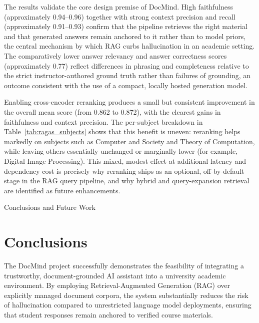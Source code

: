 \documentclass[12pt, a4paper, oneside]{report}
\makeatletter
\newcommand{\chapformat}[1]{%
  \centering
  {\fontsize{14}{17}\selectfont\itshape\addfontfeatures{LetterSpace=3.5}%
    \MakeUppercase{\chaptertitlename}\ \thechapter}\\[24pt]%
  {\fontsize{16}{19}\selectfont\bfseries\addfontfeatures{LetterSpace=0}%
    \MakeUppercase{#1}}%
}
\newcommand{\chapformatstar}[1]{%
  \centering
  {\fontsize{16}{19}\selectfont\bfseries\MakeUppercase{#1}}%
}
\newcommand{\chapterstar}[1]{%
  \clearpage
  \phantomsection
  \edef\@saved@chapcount{\the\value{chapter}}%
  \titleformat{\chapter}[block]{}{}%
    {0pt}{\chapformatstar}%
  \@originalchapter*{#1}%
  \setcounter{chapter}{\@saved@chapcount}%
  \titleformat{\chapter}[block]{}{}%
    {0pt}{\chapformat}%
}
\let\@originalchapter\chapter
\renewcommand{\chapter}{%
  \@ifstar{\chapterstar}{\@originalchapter}%
}
\let\oldsection\section
\renewcommand{\section}{%
  \addtocontents{toc}{\protect\needspace{4\baselineskip}}%
  \oldsection
}
\makeatother
\begin{document}
The results validate the core design premise of DocMind. High faithfulness (approximately 0.94--0.96) together with strong context precision and recall (approximately 0.91--0.93) confirm that the pipeline retrieves the right material and that generated answers remain anchored to it rather than to model priors, the central mechanism by which RAG curbs hallucination in an academic setting. The comparatively lower answer relevancy and answer correctness scores (approximately 0.77) reflect differences in phrasing and completeness relative to the strict instructor-authored ground truth rather than failures of grounding, an outcome consistent with the use of a compact, locally hosted generation model.

Enabling cross-encoder reranking produces a small but consistent improvement in the overall mean score (from 0.862 to 0.872), with the clearest gains in faithfulness and context precision. The per-subject breakdown in Table~\ref{tab:ragas_subjects} shows that this benefit is uneven: reranking helps markedly on subjects such as Computer and Society and Theory of Computation, while leaving others essentially unchanged or marginally lower (for example, Digital Image Processing). This mixed, modest effect at additional latency and dependency cost is precisely why reranking ships as an optional, off-by-default stage in the RAG query pipeline, and why hybrid and query-expansion retrieval are identified as future enhancements.

\chapter{Conclusions and Future Work}

\section{Conclusions}

The DocMind project successfully demonstrates the feasibility of integrating a trustworthy, document-grounded AI assistant into a university academic environment. By employing Retrieval-Augmented Generation (RAG) over explicitly managed document corpora, the system substantially reduces the risk of hallucination compared to unrestricted language model deployments, ensuring that student responses remain anchored to verified course materials.
\end{document}
